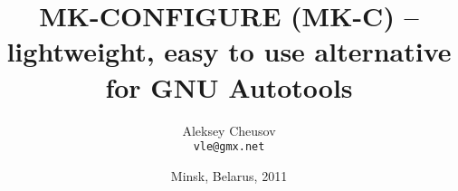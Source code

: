 \documentclass[hyperref={colorlinks=true}]{beamer}
\title{MK-CONFIGURE (MK-C) -- lightweight,
  easy to use alternative for GNU Autotools}
\author{Aleksey Cheusov \\ \texttt{vle@gmx.net}}
\date{Minsk, Belarus, 2011}
\begin{document}

\newenvironment{Code}[1]%
              {\Verbatim[label=\bf{#1},frame=single,%
                  fontsize=\small,%
                  commandchars=\\\{\}]}%
              {\endVerbatim}


\newenvironment{CodeNoLabel}%
               {\Verbatim[frame=single,%
                   fontsize=\small,%
                   commandchars=\\\{\}]}%
               {\endVerbatim}

\newenvironment{CodeNoLabelSmallest}%
               {\Verbatim[frame=single,%
                   fontsize=\footnotesize,%
                   commandchars=\\\{\}]}%
               {\endVerbatim}
\newenvironment{CodeLarge}%
               {\Verbatim[frame=single,%
                   fontsize=\large,%
                   commandchars=\\\{\}]}%
               {\endVerbatim}

\newcommand{\prompt}[1]{{\bf{#1}}}
\newcommand{\h}[1]{{\bf{#1}}}
\newcommand{\URL}[1]{\textbf{#1}}
\newcommand{\AutohellFile}[1]{\textcolor{red}{#1}}
\newcommand{\MKCfile}[1]{\textcolor{green}{#1}}
\newcommand{\ModuleName}[1]{\textbf{#1}\textnormal{}}
\newcommand{\ProgName}[1]{\textbf{#1}\textnormal{}}
\newcommand{\ProjectName}[1]{\textbf{#1}\textnormal{}}
\newcommand{\PackageName}[1]{\textbf{#1}\textnormal{}}
\newcommand{\MKC}[1]{\large\textsf{#1}\textnormal{}\normalsize}



\begin{frame}
  \titlepage
\end{frame}
\end{document}
